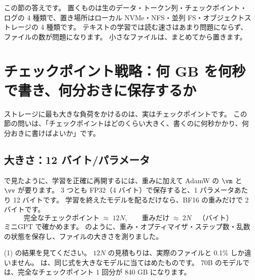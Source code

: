 この節の答えです。
置くものは生のデータ・トークン列・チェックポイント・ログの 4 種類で、置き場所はローカル NVMe・NFS・並列 FS・オブジェクトストレージの 4 種類です。
テキストの学習では読む速さはあまり問題にならず、ファイルの数が問題になります。
小さなファイルは、まとめてから置きます。

\section{チェックポイント戦略：何 GB を何秒で書き、何分おきに保存するか}\label{sec:infra-ckpt}

ストレージに最も大きな負荷をかけるのは、実はチェックポイントです。
この節の問いは、「チェックポイントはどのくらい大きく、書くのに何秒かかり、何分おきに書けばよいか」です。

\subsection*{大きさ：12 バイト/パラメータ}

で見たように、学習を正確に再開するには、重みに加えて AdamW の $\vm$ と $\vv$ が要ります。
3 つとも FP32（4 バイト）で保存すると、1 パラメータあたり 12 バイトです。
学習を終えたモデルを配るだけなら、BF16 の重みだけで 2 バイトです。
\begin{equation}
\text{完全なチェックポイント} \;\approx\; 12N, \qquad \text{重みだけ} \;\approx\; 2N \quad\text{（バイト）}
\label{eq:infra-ckpt}
\end{equation}
ミニGPT で確かめます。
のように、重み・オプティマイザ・ステップ数・乱数の状態を保存し、ファイルの大きさを測りました。



(1) の結果を見てください。
$12N$ の見積もりは、実際のファイルと 0.1\% しか違いません。
は、同じ式を大きなモデルに当てはめたものです。
70B のモデルでは、完全なチェックポイント 1 回分が 840 GB になります。

